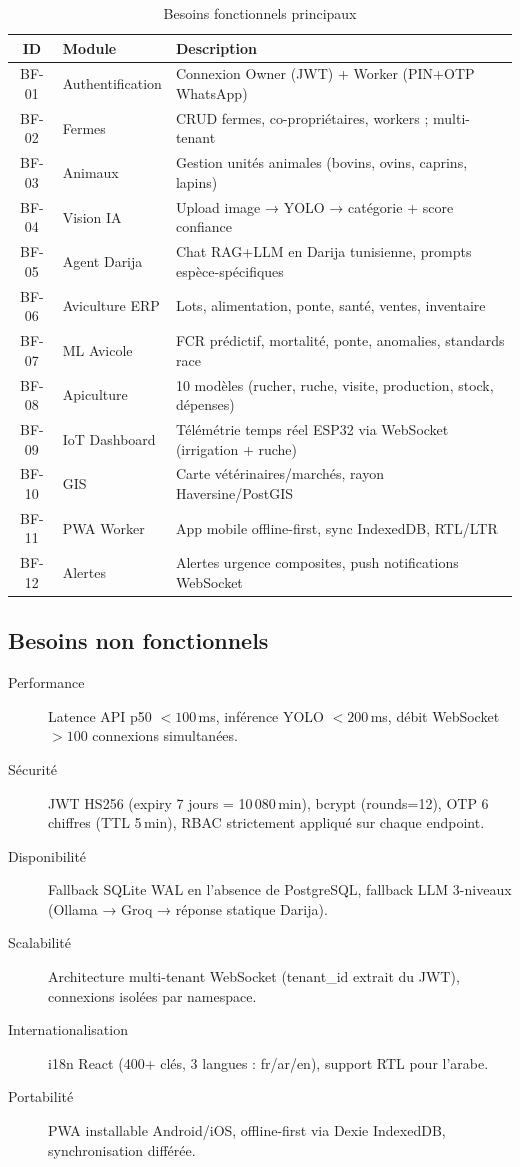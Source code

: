 \begin{table}[H]
\centering
\caption{Besoins fonctionnels principaux}
\label{tab:bf}
\begin{tabularx}{\linewidth}{clX}
\toprule
\textbf{ID} & \textbf{Module} & \textbf{Description} \\
\midrule
BF-01 & Authentification & Connexion Owner (JWT) + Worker (PIN+OTP WhatsApp) \\
BF-02 & Fermes & CRUD fermes, co-propriétaires, workers ; multi-tenant \\
BF-03 & Animaux & Gestion unités animales (bovins, ovins, caprins, lapins) \\
BF-04 & Vision IA & Upload image → YOLO → catégorie + score confiance \\
BF-05 & Agent Darija & Chat RAG+LLM en Darija tunisienne, prompts espèce-spécifiques \\
BF-06 & Aviculture ERP & Lots, alimentation, ponte, santé, ventes, inventaire \\
BF-07 & ML Avicole & FCR prédictif, mortalité, ponte, anomalies, standards race \\
BF-08 & Apiculture & 10 modèles (rucher, ruche, visite, production, stock, dépenses) \\
BF-09 & IoT Dashboard & Télémétrie temps réel ESP32 via WebSocket (irrigation + ruche) \\
BF-10 & GIS & Carte vétérinaires/marchés, rayon Haversine/PostGIS \\
BF-11 & PWA Worker & App mobile offline-first, sync IndexedDB, RTL/LTR \\
BF-12 & Alertes & Alertes urgence composites, push notifications WebSocket \\
\bottomrule
\end{tabularx}
\end{table}

\subsection{Besoins non fonctionnels}

\begin{description}
  \item[Performance] Latence API p50 $< 100$\,ms, inférence YOLO $< 200$\,ms,
        débit WebSocket $> 100$ connexions simultanées.
  \item[Sécurité] JWT HS256 (expiry 7 jours = 10\,080\,min), bcrypt (rounds=12), OTP 6 chiffres
        (TTL 5\,min), RBAC strictement appliqué sur chaque endpoint.
  \item[Disponibilité] Fallback SQLite WAL en l'absence de PostgreSQL,
        fallback LLM 3-niveaux (Ollama → Groq → réponse statique Darija).
  \item[Scalabilité] Architecture multi-tenant WebSocket (tenant\_id extrait
        du JWT), connexions isolées par namespace.
  \item[Internationalisation] i18n React (400+ clés, 3 langues : fr/ar/en),
        support RTL pour l'arabe.
  \item[Portabilité] PWA installable Android/iOS, offline-first via Dexie
        IndexedDB, synchronisation différée.
\end{description}

